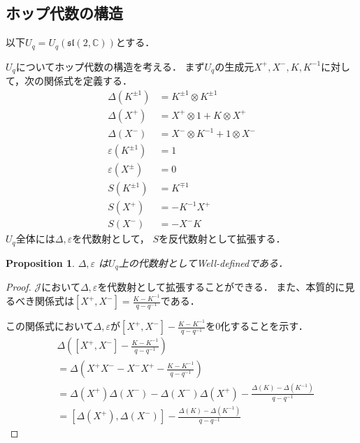 \documentclass[10pt,dvipdfm]{beamer}
\newtheorem{proposition}{Proposition}
\newcommand{\CC}{\mathbb{C}}
\begin{document}
  \subsection{ホップ代数の構造}
  \begin{frame}
    以下$U_q = U_q(\mathfrak{sl}(2,\CC))$とする．

    $U_q$についてホップ代数の構造を考える．
    まず$U_q$の生成元$X^+,X^-,K,K^{-1}$に対して，次の関係式を定義する．
    \begin{align*}
      \Delta(K^{\pm1}) &= K^{\pm1}\otimes K^{\pm1}\\
      \Delta(X^+) &= X^+\otimes 1 + K\otimes X^+\\
      \Delta(X^-) &= X^-\otimes K^{-1} + 1\otimes X^-\\
      \varepsilon(K^{\pm1}) &= 1\\
      \varepsilon(X^{\pm}) &= 0\\
      S(K^{\pm1}) &= K^{\mp1}\\
      S(X^+) &= -K^{-1}X^+\\
      S(X^-) &= -X^-K
    \end{align*}
    $U_q$全体には$\Delta,\varepsilon$を代数射として，
    $S$を反代数射として拡張する．
  \end{frame}
  \begin{frame}
    \begin{proposition}
      $\Delta,\varepsilon$ は$U_q$上の代数射としてWell-definedである．
    \end{proposition}
    \begin{proof}
      $\mathscr{J}$において$\Delta,\varepsilon$を代数射として拡張することができる．
      また、本質的に見るべき関係式は$[X^+,X^-]=\frac{K-K^{-1}}{q-q^{-1}}$である．
  
      この関係式において$\Delta,\varepsilon$が$[X^+,X^-]-\frac{K-K^{-1}}{q-q^{-1}}$を$0$化することを示す．
      \begin{align*}
        &\Delta\left([X^+,X^-] - \frac{K-K^{-1}}{q-q^{-1}}\right) \\
        &= \Delta\left(X^+X^- - X^-X^+ - \frac{K-K^{-1}}{q-q^{-1}}\right)\\
        &= \Delta(X^+)\Delta(X^-) - \Delta(X^-)\Delta(X^+) - \frac{\Delta(K)-\Delta(K^{-1})}{q-q^{-1}}\\
        &= [\Delta(X^+),\Delta(X^-)] - \frac{\Delta(K) - \Delta(K^{-1})}{q-q^{-1}}
      \end{align*}
      \let\qedsymbol\relax
    \end{proof}
  \end{frame}
\end{document}
